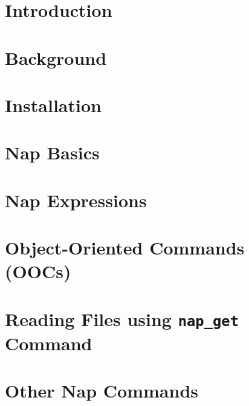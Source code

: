 \documentclass[a4paper]{book}
\begin{document}



\tableofcontents

\chapter{Introduction}
    
    
    

\chapter{Background}
    
    
    
    
    
    

\chapter{Installation}
    
    

\chapter{Nap Basics}
    
    
    
    
    

\chapter{Nap Expressions}
    
    
    
    
    

\chapter{Object-Oriented Commands (OOCs)}
    
    
    
    
    

\chapter{Reading Files using \texttt{nap\_get} Command}
    

\chapter{Other Nap Commands}
    
    
\end{document}
